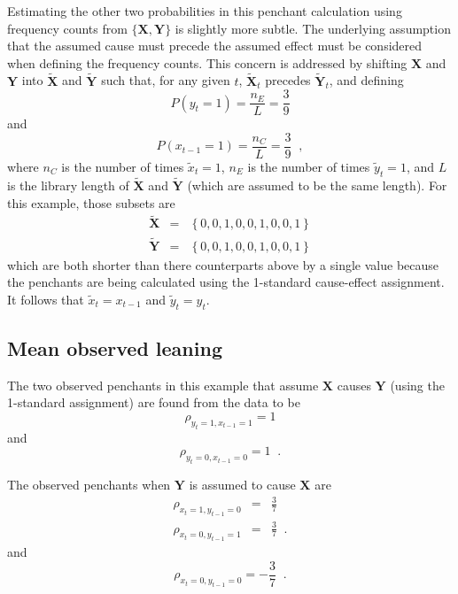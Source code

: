 \documentclass[twocolumn,aps,pre,groupedaddress]{revtex4-1}
\begin{document}
Estimating the other two probabilities in this penchant calculation using frequency counts from $\{\mathbf{X},\mathbf{Y}\}$ is slightly more subtle.  The underlying assumption that the assumed cause must precede the assumed effect must be considered when defining the frequency counts.  This concern is addressed by shifting $\mathbf{X}$ and $\mathbf{Y}$ into $\tilde{\mathbf{X}}$ and $\tilde{\mathbf{Y}}$ such that, for any given $t$, $\tilde{\mathbf{X}}_t$ precedes $\tilde{\mathbf{Y}}_t$, and defining 
\begin{equation}
P\left( y_t = 1\right) = \frac{n_E}{L} = \frac{3}{9}
\end{equation}
and
\begin{equation}
P\left( x_{t-1} = 1\right) = \frac{n_C}{L} = \frac{3}{9}\;\;,
\end{equation}
where $n_C$ is the number of times $\tilde{x}_t = 1$, $n_E$ is the number of times $\tilde{y}_t = 1$, and $L$ is the library length of $\tilde{\mathbf{X}}$ and $\tilde{\mathbf{Y}}$ (which are assumed to be the same length).  For this example, those subsets are
\begin{eqnarray*}
\tilde{\mathbf{X}} &=& \left\{0,0,1,0,0,1,0,0,1\right\}\\
\tilde{\mathbf{Y}} &=& \left\{0,0,1,0,0,1,0,0,1\right\}
\end{eqnarray*}
which are both shorter than there counterparts above by a single value because the penchants are being calculated using the 1-standard cause-effect assignment.  It follows that $\tilde{x}_t = x_{t-1}$ and $\tilde{y}_t=y_t$.  

\subsection{Mean observed leaning}
\label{sec:meanlean}
The two observed penchants in this example that assume $\mathbf{X}$ causes $\mathbf{Y}$ (using the 1-standard assignment) are found from the data to be
\begin{equation}
\label{eqn:rhoex1}
\rho_{y_t=1,x_{t-1}=1}=1
\end{equation}
and
\begin{equation}
\rho_{y_t=0,x_{t-1}=0}=1\;\;.
\end{equation}

The observed penchants when $\mathbf{Y}$ is assumed to cause $\mathbf{X}$ are
\begin{eqnarray}
\rho_{x_t=1,y_{t-1}=0} &=& \frac{3}{7}\\
\rho_{x_t=0,y_{t-1}=1} &=& \frac{3}{7}\;\;.
\end{eqnarray}
and
\begin{equation}
\rho_{x_t=0,y_{t-1}=0}=-\frac{3}{7}\;\;.
\end{equation}
\end{document}
